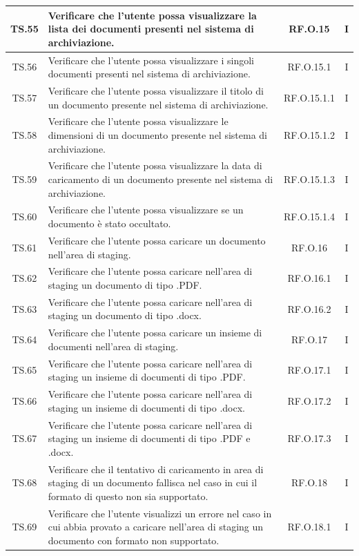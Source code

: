 \documentclass[10pt, a4paper]{article}
\begin{document}
\begin{xltabular}{\textwidth}{|c|X|c|c|}
\hline
TS.55 & Verificare che l'utente possa visualizzare la lista dei documenti presenti nel sistema di archiviazione. & RF.O.15 & I \\
\hline
TS.56 & Verificare che l'utente possa visualizzare i singoli documenti presenti nel sistema di archiviazione. & RF.O.15.1 & I \\
\hline
TS.57 & Verificare che l'utente possa visualizzare il titolo di un documento presente nel sistema di archiviazione. & RF.O.15.1.1 & I \\
\hline
TS.58 & Verificare che l'utente possa visualizzare le dimensioni di un documento presente nel sistema di archiviazione. & RF.O.15.1.2 & I \\
\hline
TS.59 & Verificare che l'utente possa visualizzare la data di caricamento di un documento presente nel sistema di archiviazione. & RF.O.15.1.3 & I \\
\hline
TS.60 & Verificare che l'utente possa visualizzare se un documento è stato occultato. & RF.O.15.1.4 & I \\
\hline
TS.61 & Verificare che l'utente possa caricare un documento nell’area di staging. & RF.O.16 & I \\
\hline
TS.62 & Verificare che l'utente possa caricare nell’area di staging un documento di tipo .PDF. & RF.O.16.1 & I \\
\hline
TS.63 & Verificare che l'utente possa caricare nell’area di staging un documento di tipo .docx. & RF.O.16.2 & I \\
\hline
TS.64 & Verificare che l'utente possa caricare un insieme di documenti nell’area di staging. & RF.O.17 & I \\
\hline
TS.65 & Verificare che l'utente possa caricare nell’area di staging un insieme di documenti di tipo .PDF. & RF.O.17.1 & I \\
\hline
TS.66 & Verificare che l'utente possa caricare nell’area di staging un insieme di documenti di tipo .docx. & RF.O.17.2 & I \\
\hline
TS.67 & Verificare che l'utente possa caricare nell’area di staging un insieme di documenti di tipo .PDF e .docx. & RF.O.17.3 & I \\
\hline
TS.68 & Verificare che il tentativo di caricamento in area di staging di un documento fallisca nel caso in cui il formato di questo non sia supportato. & RF.O.18 & I \\
\hline
TS.69 & Verificare che l'utente visualizzi un errore nel caso in cui abbia provato a caricare nell’area di staging un documento con formato non supportato. & RF.O.18.1 & I \\

\end{xltabular}
\end{document}
